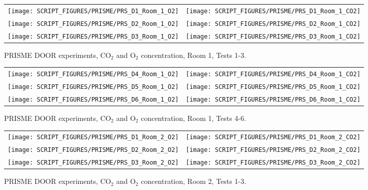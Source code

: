 \begin{figure}[!ht]
\begin{tabular*}{\textwidth}{l@{\extracolsep{\fill}}r}
\texttt{[image: SCRIPT\_FIGURES/PRISME/PRS\_D1\_Room\_1\_O2]} &
\texttt{[image: SCRIPT\_FIGURES/PRISME/PRS\_D1\_Room\_1\_CO2]} \\
\texttt{[image: SCRIPT\_FIGURES/PRISME/PRS\_D2\_Room\_1\_O2]} &
\texttt{[image: SCRIPT\_FIGURES/PRISME/PRS\_D2\_Room\_1\_CO2]} \\
\texttt{[image: SCRIPT\_FIGURES/PRISME/PRS\_D3\_Room\_1\_O2]} &
\texttt{[image: SCRIPT\_FIGURES/PRISME/PRS\_D3\_Room\_1\_CO2]}
\end{tabular*}
\caption[PRISME DOOR experiments, CO$_2$ and O$_2$ concentration, Room 1, Tests 1-3]{PRISME DOOR experiments, CO$_2$ and O$_2$ concentration, Room 1, Tests 1-3.}
\label{PRISME_Gas_1}
\end{figure}

\begin{figure}[p]
\begin{tabular*}{\textwidth}{l@{\extracolsep{\fill}}r}
\texttt{[image: SCRIPT\_FIGURES/PRISME/PRS\_D4\_Room\_1\_O2]} &
\texttt{[image: SCRIPT\_FIGURES/PRISME/PRS\_D4\_Room\_1\_CO2]} \\
\texttt{[image: SCRIPT\_FIGURES/PRISME/PRS\_D5\_Room\_1\_O2]} &
\texttt{[image: SCRIPT\_FIGURES/PRISME/PRS\_D5\_Room\_1\_CO2]} \\
\texttt{[image: SCRIPT\_FIGURES/PRISME/PRS\_D6\_Room\_1\_O2]} &
\texttt{[image: SCRIPT\_FIGURES/PRISME/PRS\_D6\_Room\_1\_CO2]}
\end{tabular*}
\caption[PRISME DOOR experiments, CO$_2$ and O$_2$ concentration, Room 1, Tests 4-6]{PRISME DOOR experiments, CO$_2$ and O$_2$ concentration, Room 1, Tests 4-6.}
\label{PRISME_Gas_2}
\end{figure}

\begin{figure}[p]
\begin{tabular*}{\textwidth}{l@{\extracolsep{\fill}}r}
\texttt{[image: SCRIPT\_FIGURES/PRISME/PRS\_D1\_Room\_2\_O2]} &
\texttt{[image: SCRIPT\_FIGURES/PRISME/PRS\_D1\_Room\_2\_CO2]} \\
\texttt{[image: SCRIPT\_FIGURES/PRISME/PRS\_D2\_Room\_2\_O2]} &
\texttt{[image: SCRIPT\_FIGURES/PRISME/PRS\_D2\_Room\_2\_CO2]} \\
\texttt{[image: SCRIPT\_FIGURES/PRISME/PRS\_D3\_Room\_2\_O2]} &
\texttt{[image: SCRIPT\_FIGURES/PRISME/PRS\_D3\_Room\_2\_CO2]}
\end{tabular*}
\caption[PRISME DOOR experiments, CO$_2$ and O$_2$ concentration, Room 2, Tests 1-3]{PRISME DOOR experiments, CO$_2$ and O$_2$ concentration, Room 2, Tests 1-3.}
\label{PRISME_Gas_3}
\end{figure}

